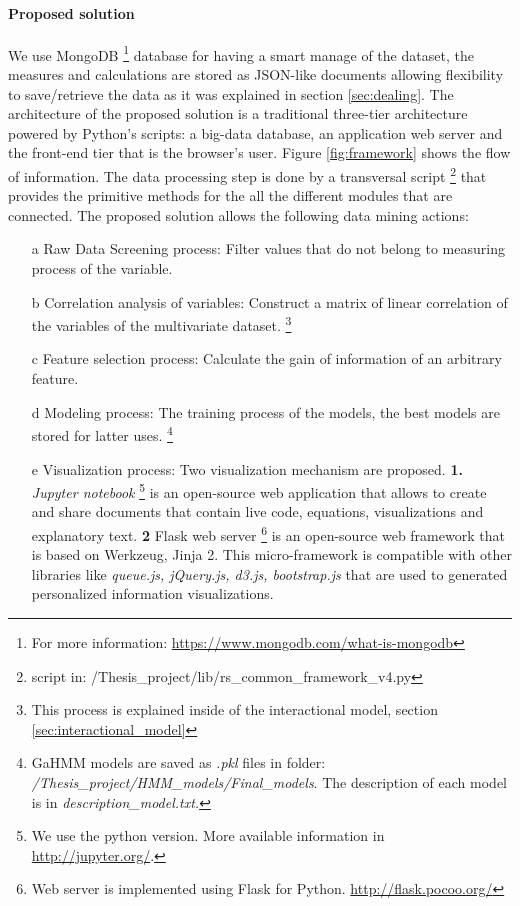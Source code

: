 \paragraph{Proposed solution}
We use MongoDB \footnote{For more information: \url{https://www.mongodb.com/what-is-mongodb}} database for having a smart manage of the dataset, the measures and calculations are stored as JSON-like documents allowing flexibility to save/retrieve the data as it was explained in section \ref{sec:dealing}. The architecture of the proposed solution is a traditional three-tier architecture powered by Python's scripts: a big-data database, an application web server and the front-end tier that is the browser's user. Figure \ref{fig:framework} shows the flow of information. The data processing step is done by a transversal script \footnote{script in: /Thesis\_project/lib/rs\_common\_framework\_v4.py} that provides the primitive methods for the all the different modules that are connected. The proposed solution allows the following data mining actions:

\begin{itemize}
\item[a] Raw Data Screening process: Filter values that do not belong to measuring process of the variable.
\item[b] Correlation analysis of variables: Construct a matrix of linear correlation of the variables of the multivariate dataset. \footnote{This process is explained inside of the interactional model, section \ref{sec:interactional_model}}
\item[c] Feature selection process: Calculate the gain of information of an arbitrary feature.
\item[d] Modeling process: The training process of the models, the best models are stored for latter uses. \footnote{ GaHMM models are saved as \textit{.pkl} files in folder: \textit{/Thesis\_project/HMM\_models/Final\_models}. The description of each model is in \textit{description\_model.txt.} }
\item[e] Visualization process: Two visualization mechanism are proposed. \textbf{1.} \textit{Jupyter notebook} \footnote{We use the python version. More available information in \url{http://jupyter.org/}.} is an open-source web application that allows to create and share documents that contain live code, equations, visualizations and explanatory text. \textbf{2} Flask web server \footnote{Web server is implemented using Flask for Python. \url{http://flask.pocoo.org/}} is an open-source web framework that is based on Werkzeug, Jinja 2. This micro-framework is compatible with other libraries like \textit{queue.js, jQuery.js, d3.js, bootstrap.js} that are used to generated personalized information visualizations. 

\end{itemize}

